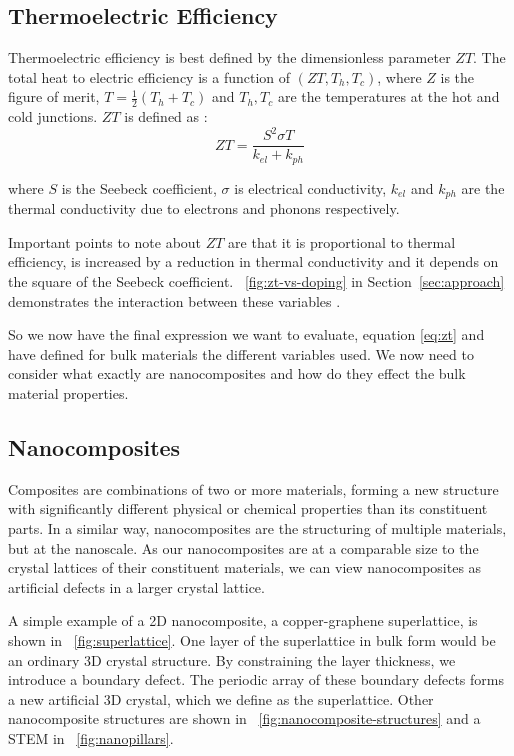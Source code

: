 \documentclass[12pt]{article}
\newcommand{\figref}[2][\figurename~]{#1\ref{#2}}
\newcommand{\secref}[2][Section~]{#1\ref{#2}}
\begin{document}
\pagebreak

\subsection{Thermoelectric Efficiency}
\label{sec:efficiency}
Thermoelectric efficiency is best defined by the dimensionless parameter $ZT$. The total heat to electric efficiency is a function of $(ZT, T_h, T_c)$, where $Z$ is the figure of merit, $T = \frac{1}{2}(T_h + T_c)$ and $T_h, T_c$ are the temperatures at the hot and cold junctions. $ZT$ is defined as \cite{modern-thermoelectrics}:
\begin{equation}
\label{eq:zt}
	ZT = \frac{S^2 \sigma T}{k_{el} + k_{ph}}
\end{equation}

where $S$ is the Seebeck coefficient, $\sigma$ is electrical conductivity, $k_{el}$ and $k_{ph}$ are the thermal conductivity due to electrons and phonons respectively.

Important points to note about $ZT$ are that it is proportional to thermal efficiency, is increased by a reduction in thermal conductivity and it depends on the square of the Seebeck coefficient. \figref{fig:zt-vs-doping} in \secref{sec:approach} demonstrates the interaction between these variables .

So we now have the final expression we want to evaluate, equation \eqref{eq:zt} and have defined for bulk materials the different variables used. We now need to consider what exactly are nanocomposites and how do they effect the bulk material properties.

\subsection{Nanocomposites}
Composites are combinations of two or more materials, forming a new structure with significantly different physical or chemical properties than its constituent parts. In a similar way, nanocomposites are the structuring of multiple materials, but at the nanoscale. As our nanocomposites are at a comparable size to the crystal lattices of their constituent materials, we can view nanocomposites as artificial defects in a larger crystal lattice.

A simple example of a 2D nanocomposite, a copper-graphene superlattice, is shown in \figref{fig:superlattice}. One layer of the superlattice in bulk form would be an ordinary 3D crystal structure. By constraining the layer thickness, we introduce a boundary defect. The periodic array of these boundary defects forms a new artificial 3D crystal, which we define as the superlattice. Other nanocomposite structures are shown in \figref{fig:nanocomposite-structures} and a STEM in \figref{fig:nanopillars}.
\end{document}
